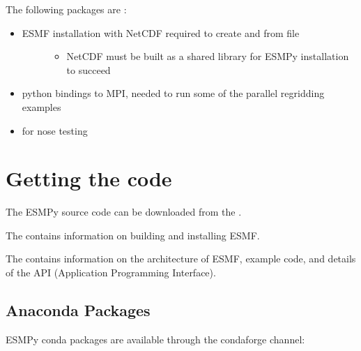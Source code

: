 \documentclass[letterpaper,10pt,english]{sphinxmanual}
\begin{document}
The following packages are :
\begin{itemize}
\item {} \begin{description}
\item[{ESMF installation with NetCDF \sphinxhyphen{} required to create {\hyperref[\detokenize{grid:ESMF.api.grid.Grid}]{}} and {\hyperref[\detokenize{mesh:ESMF.api.mesh.Mesh}]{}} from file}] \leavevmode\begin{itemize}
\item {} 
NetCDF must be built as a shared library for ESMPy installation to succeed

\end{itemize}

\end{description}

\item {} 
\sphinxhyphen{} python bindings to MPI, needed to run some of the parallel regridding examples

\item {} 
 \sphinxhyphen{} for nose testing

\end{itemize}


\section{Getting the code}
\label{\detokenize{install:getting-the-code}}
The ESMPy source code can be downloaded from the
.

The 
contains information on building and installing ESMF.

The 
contains information on the architecture of ESMF, example code, and details of the API (Application Programming
Interface).


\subsection{Anaconda Packages}
\label{\detokenize{install:anaconda-packages}}
ESMPy conda packages are available through the conda\sphinxhyphen{}forge channel:
\end{document}
